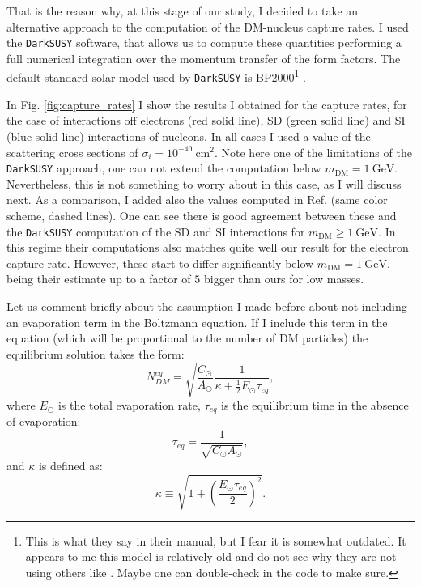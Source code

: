 That is the reason why, at this stage of our study, I decided to take an alternative approach to the computation of the DM-nucleus capture rates. I used the \texttt{DarkSUSY} software, that allows us to compute these quantities performing a full numerical integration over the momentum transfer of the form factors. The default standard solar model used by \texttt{DarkSUSY} is BP2000\footnote{This is what they say in their manual, but I fear it is somewhat outdated. It appears to me this model is relatively old and do not see why they are not using others like \cite{Bahcall2004}. Maybe one can double-check in the code to make sure.} \cite{Bahcall2000}.

In Fig. \ref{fig:capture_rates} I show the results I obtained for the capture rates, for the case of interactions off electrons (red solid line), SD (green solid line) and SI (blue solid line) interactions of nucleons. In all cases I used a value of the scattering cross sections of $\sigma_{i} = 10^{-40} \ \mathrm{cm}^{2}$. Note here one of the limitations of the \texttt{DarkSUSY} approach, one can not extend the computation below $m_{\mathrm{DM}} = 1 \ \mathrm{GeV}$. Nevertheless, this is not something to worry about in this case, as I will discuss next. As a comparison, I added also the values computed in Ref. \cite{Palomares2017} (same color scheme, dashed lines). One can see there is good agreement between these and the \texttt{DarkSUSY} computation of the SD and SI interactions for $m_{\mathrm{DM}} \geq 1 \ \mathrm{GeV}$. In this regime their computations also matches quite well our result for the electron capture rate. However, these start to differ significantly below $m_{\mathrm{DM}} = 1 \ \mathrm{GeV}$, being their estimate up to a factor of $5$ bigger than ours for low masses.

Let us comment briefly about the assumption I made before about not including an evaporation term in the Boltzmann equation. If I include this term in the equation (which will be proportional to the number of DM particles) the equilibrium solution takes the form:
\begin{equation}\label{2.17}
	N_{DM}^{eq} = \sqrt{\frac{C_{\odot}}{A_{\odot}}} \frac{1}{\kappa + \frac{1}{2} E_{\odot} \tau_{eq}},
\end{equation}
where $E_{\odot}$ is the total evaporation rate, $\tau_{eq}$ is the equilibrium time in the absence of evaporation:
\begin{equation}\label{2.18}
	\tau_{eq} = \frac{1}{\sqrt{C_{\odot} A_{\odot}}},
\end{equation}
and $\kappa$ is defined as:
\begin{equation}\label{2.19}
	\kappa \equiv \sqrt{1+\left(\frac{E_{\odot}\tau_{eq}}{2}\right)^{2}}.
\end{equation}

